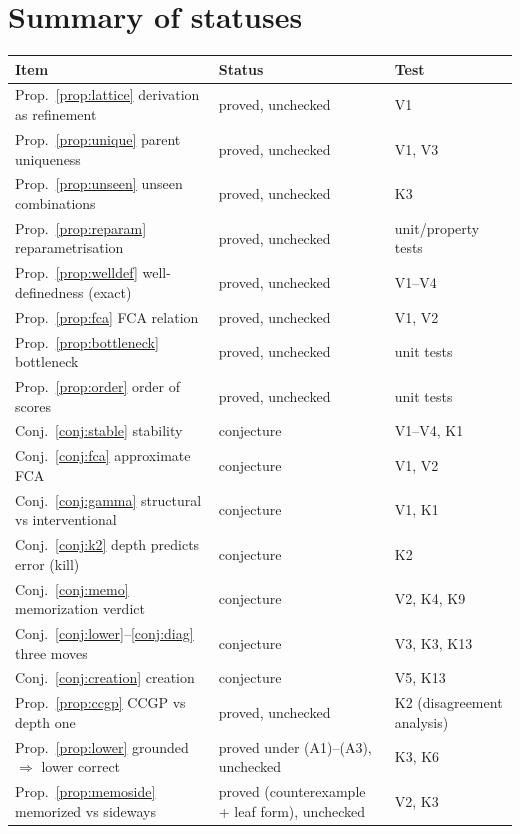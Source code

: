 \documentclass[11pt]{article}
\theoremstyle{definition}
\theoremstyle{plain}
\theoremstyle{remark}
\begin{document}
\section{Summary of statuses}

\begin{longtable}{p{}p{}p{}}
\toprule
Item & Status & Test \\
\midrule
\endhead
Prop.~\ref{prop:lattice} derivation as refinement & proved, unchecked & V1 \\
Prop.~\ref{prop:unique} parent uniqueness & proved, unchecked & V1, V3 \\
Prop.~\ref{prop:unseen} unseen combinations & proved, unchecked & K3 \\
Prop.~\ref{prop:reparam} reparametrisation & proved, unchecked & unit/property tests \\
Prop.~\ref{prop:welldef} well-definedness (exact) & proved, unchecked & V1--V4 \\
Prop.~\ref{prop:fca} FCA relation & proved, unchecked & V1, V2 \\
Prop.~\ref{prop:bottleneck} bottleneck & proved, unchecked & unit tests \\
Prop.~\ref{prop:order} order of scores & proved, unchecked & unit tests \\
Conj.~\ref{conj:stable} stability & conjecture & V1--V4, K1 \\
Conj.~\ref{conj:fca} approximate FCA & conjecture & V1, V2 \\
Conj.~\ref{conj:gamma} structural vs interventional & conjecture & V1, K1 \\
Conj.~\ref{conj:k2} depth predicts error (kill) & conjecture & K2 \\
Conj.~\ref{conj:memo} memorization verdict & conjecture & V2, K4, K9 \\
Conj.~\ref{conj:lower}--\ref{conj:diag} three moves & conjecture & V3, K3, K13 \\
Conj.~\ref{conj:creation} creation & conjecture & V5, K13 \\
Prop.~\ref{prop:ccgp} CCGP vs depth one & proved, unchecked & K2 (disagreement analysis) \\
Prop.~\ref{prop:lower} grounded $\Rightarrow$ lower correct & proved under (A1)--(A3), unchecked & K3, K6 \\
Prop.~\ref{prop:memoside} memorized vs sideways & proved (counterexample + leaf form), unchecked & V2, K3 \\
\bottomrule
\end{longtable}
\end{document}
